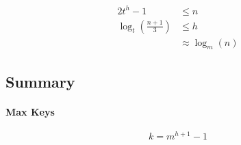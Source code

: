   \begin{align*}
    2 t^{h} - 1 &\leq n \\ 
    \log_{t} \left( \frac{n + 1}{3} \right) &\leq h \\ 
    &\approx \log_{m} \left( n \right)
  \end{align*}
  
\subsection{Summary}

  \paragraph{Max Keys}
  \begin{equation}
    k = m^{h + 1} - 1
  \end{equation}